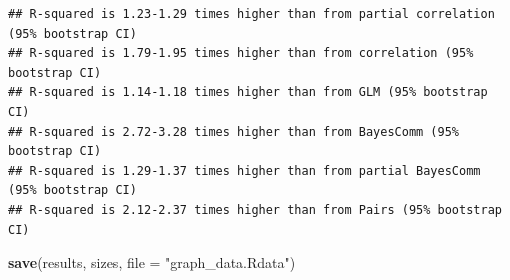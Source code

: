 \documentclass[11pt,]{article}
\newenvironment{Shaded}{\begin{snugshade}}{\end{snugshade}}
\newcommand{\KeywordTok}[1]{\textcolor[rgb]{0.13,0.29,0.53}{\textbf{{#1}}}}
\newcommand{\DataTypeTok}[1]{\textcolor[rgb]{0.13,0.29,0.53}{{#1}}}
\newcommand{\DecValTok}[1]{\textcolor[rgb]{0.00,0.00,0.81}{{#1}}}
\newcommand{\StringTok}[1]{\textcolor[rgb]{0.31,0.60,0.02}{{#1}}}
\newcommand{\NormalTok}[1]{{#1}}
\begin{document}
\begin{Shaded}
\end{Shaded}

\begin{verbatim}
## R-squared is 1.23-1.29 times higher than from partial correlation (95% bootstrap CI)
## R-squared is 1.79-1.95 times higher than from correlation (95% bootstrap CI)
## R-squared is 1.14-1.18 times higher than from GLM (95% bootstrap CI)
## R-squared is 2.72-3.28 times higher than from BayesComm (95% bootstrap CI)
## R-squared is 1.29-1.37 times higher than from partial BayesComm (95% bootstrap CI)
## R-squared is 2.12-2.37 times higher than from Pairs (95% bootstrap CI)
\end{verbatim}

\begin{Shaded}
\begin{Highlighting}[]
\KeywordTok{save}\NormalTok{(results, sizes, }\DataTypeTok{file =} \StringTok{"graph_data.Rdata"}\NormalTok{)}
\end{Highlighting}
\end{Shaded}
\end{document}
